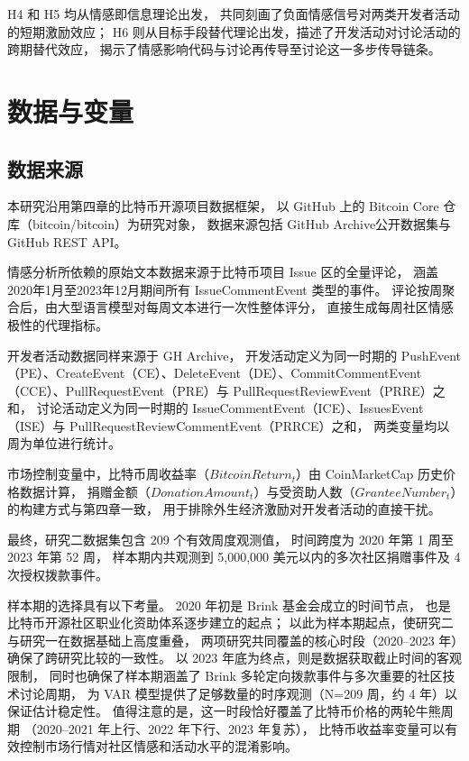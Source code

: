\documentclass[
    type = master, %
    degree = professional,        %
    decl-page,  %
    twoside,                %
    fontset = fandol %
  ]{njuthesis}
\begin{document}
H4 和 H5 均从情感即信息理论出发，
共同刻画了负面情感信号对两类开发者活动的短期激励效应；
H6 则从目标手段替代理论出发，描述了开发活动对讨论活动的跨期替代效应，
揭示了情感影响代码与讨论再传导至讨论这一多步传导链条。


\section{数据与变量}

\subsection{数据来源}

本研究沿用第四章的比特币开源项目数据框架，
以 GitHub 上的 Bitcoin Core 仓库（bitcoin/bitcoin）为研究对象，
数据来源包括 GitHub Archive公开数据集与 GitHub REST API。

情感分析所依赖的原始文本数据来源于比特币项目 Issue 区的全量评论，
涵盖2020年1月至2023年12月期间所有 IssueCommentEvent 类型的事件。
评论按周聚合后，由大型语言模型对每周文本进行一次性整体评分，
直接生成每周社区情感极性的代理指标。

开发者活动数据同样来源于 GH Archive，
开发活动定义为同一时期的
PushEvent（PE）、CreateEvent（CE）、DeleteEvent（DE）、CommitCommentEvent（CCE）、PullRequestEvent（PRE）与 PullRequestReviewEvent（PRRE）之和，
讨论活动定义为同一时期的
IssueCommentEvent（ICE）、IssuesEvent（ISE）与 PullRequestReviewCommentEvent（PRRCE）之和，
两类变量均以周为单位进行统计。

市场控制变量中，比特币周收益率（$\mathit{BitcoinReturn}_t$）由 CoinMarketCap 历史价格数据计算，
捐赠金额（$\mathit{DonationAmount}_t$）与受资助人数（$\mathit{GranteeNumber}_t$）的构建方式与第四章一致，
用于排除外生经济激励对开发者活动的直接干扰。

最终，研究二数据集包含 209 个有效周度观测值，
时间跨度为 2020 年第 1 周至 2023 年第 52 周，
样本期内共观测到 5,000,000 美元以内的多次社区捐赠事件及 4 次授权拨款事件。

样本期的选择具有以下考量。
2020 年初是 Brink 基金会成立的时间节点，
也是比特币开源社区职业化资助体系逐步建立的起点；
以此为样本期起点，使研究二与研究一在数据基础上高度重叠，
两项研究共同覆盖的核心时段（2020--2023 年）确保了跨研究比较的一致性。
以 2023 年底为终点，则是数据获取截止时间的客观限制，
同时也确保了样本期涵盖了 Brink 多轮定向拨款事件与多次重要的社区技术讨论周期，
为 VAR 模型提供了足够数量的时序观测（N=209 周，约 4 年）以保证估计稳定性。
值得注意的是，这一时段恰好覆盖了比特币价格的两轮牛熊周期
（2020--2021 年上行、2022 年下行、2023 年复苏），
比特币收益率变量可以有效控制市场行情对社区情感和活动水平的混淆影响。
\end{document}
